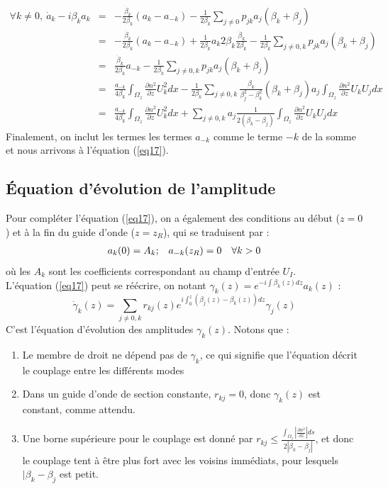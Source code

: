 \documentclass{article}
\begin{document}
\begin{eqnarray*}
\forall k\neq 0,\ \dot{a}_k-i\beta_ka_k&=&-\frac{\dot{\beta}_k}{2\beta_k}(a_k-a_{-k})-\frac{1}{2\beta_k}\sum_{j\neq 0}p_{jk}a_j(\beta_k+\beta_j)\\
		&=&-\frac{\dot{\beta}_k}{2\beta_k}(a_k-a_{-k})+\frac{1}{2\beta_k}a_k2\beta_k\frac{\dot{\beta}_k}{2\beta_k}-\frac{1}{2\beta_k}\sum_{j\neq 0,k}p_{jk}a_j(\beta_k+\beta_j)\\
		&=&\frac{\dot{\beta}_k}{2\beta_k}a_{-k}-\frac{1}{2\beta_k}\sum_{j\neq 0,k}p_{jk}a_j(\beta_k+\beta_j)\\
		&=&\frac{a_{-k}}{4\beta_k}\int_{\Omega_z}\frac{\partial n^2}{\partial z}U_k^2dx-\frac{1}{2\beta_k}\sum_{j\neq 0,k}\frac{\beta_k}{\beta_j^2-\beta_k^2}(\beta_k+\beta_j)a_j\int_{\Omega_z}\frac{\partial n^2}{\partial z}U_kU_jdx\\
		&=&\frac{a_{-k}}{4\beta_k}\int_{\Omega_z}\frac{\partial n^2}{\partial z}U_k^2dx + \sum_{j\neq 0,k} a_j\frac{1}{2(\beta_k-\beta_j)}\int_{\Omega_z}\frac{\partial n^2}{\partial z}U_kU_jdx\ 
\end{eqnarray*}
Finalement, on inclut les termes les termes $a_{-k}$ comme le terme $-k$ de la somme et nous arrivons à l'équation (\ref{eq17}).

\subsection{Équation d'évolution de l'amplitude}
Pour compléter l'équation (\ref{eq17}), on a également des conditions au début ($z=0$) et à la fin du guide d'onde ($z=z_R$), qui se traduisent par :
\begin{equation}\label{eq18}
\begin{array}{c c c}
	a_k(0)=A_k; & a_{-k}(z_R)=0 & \forall k>0
\end{array}
\end{equation}
où les $A_k$ sont les coefficients correspondant au champ d'entrée $U_I$.\\
L'équation (\ref{eq17}) peut se réécrire, on notant $\gamma_k(z)=e^{-i\int \beta_k(z)dz}a_k(z)$ :
\begin{equation}\label{eq19}
	 \dot{\gamma}_k(z)=\sum_{j\neq 0,k} r_{kj}(z)e^{i\int_0^z (\beta_j(z)-\beta_k(z))dz}\gamma_j(z)
\end{equation}
C'est l'équation d'évolution des amplitudes $\gamma_k(z)$. Notons que :
\begin{enumerate}
\item Le membre de droit ne dépend pas de $\gamma_k$, ce qui signifie que l'équation décrit le couplage entre les différents modes
\item Dans un guide d'onde de section constante, $r_{kj}=0$, donc $\gamma_k(z)$ est constant, comme attendu.
\item Une borne supérieure pour le couplage est donné par $r_{kj}\leq \frac{\int_{\Omega_z} \left|\frac{\partial n^2}{\partial z}\right|ds}{2|\beta_k-\beta_j|}$, et donc le couplage tent à être plus fort avec les voisins immédiats, pour lesquels $|\beta_k-\beta_j$ est petit.
\end{enumerate}
\end{document}
